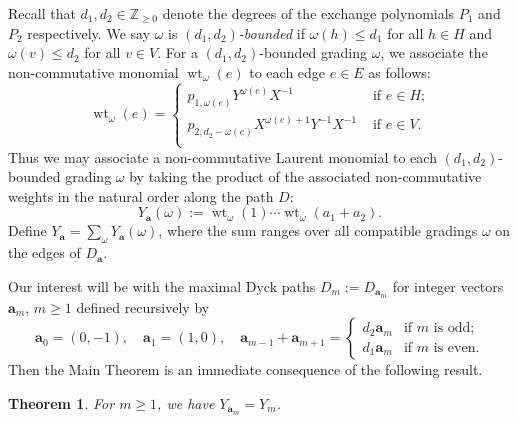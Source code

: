 \documentclass{amsart}
\newtheorem{theorem}{Theorem}[section]
\newcommand{\bfa}{\mathbf{a}}
\newcommand{\ZZ}{\mathbb{Z}}
\newcommand{\wt}{\operatorname{wt}}
\begin{document}
Recall that $d_1,d_2\in\ZZ_{\ge0}$ denote the degrees of the exchange polynomials $P_1$ and $P_2$ respectively.  We say $\omega$ is \emph{$(d_1,d_2)$-bounded} if $\omega(h)\le d_1$ for all $h\in H$ and $\omega(v)\le d_2$ for all $v\in V$.  
For a $(d_1,d_2)$-bounded grading $\omega$, we associate the non-commutative monomial $\wt_\omega(e)$ to each edge $e\in E$ as follows:
\begin{equation}\label{eq:edge weights}
  \wt_\omega(e)=\begin{cases}
                    p_{1,\omega(e)}Y^{\omega(e)}X^{-1} & \text{ if $e\in H$;}\\
                    p_{2,d_2-\omega(e)}X^{\omega(e)+1}Y^{-1}X^{-1} & \text{ if $e\in V$.}\\
                \end{cases}
\end{equation}
Thus we may associate a non-commutative Laurent monomial to each $(d_1,d_2)$-bounded grading $\omega$ by taking the product of the associated non-commutative weights in the natural order along the path $D$:
\[Y_\bfa(\omega):=\wt_\omega(1)\cdots\wt_\omega(a_1+a_2).\]
Define $Y_\bfa=\sum\limits_\omega Y_\bfa(\omega)$, where the sum ranges over all compatible gradings $\omega$ on the edges of $D_\bfa$.

Our interest will be with the maximal Dyck paths $D_m:=D_{\bfa_m}$ for integer vectors $\bfa_m$, $m\ge1$ defined recursively by
\begin{equation}\label{eq:roots recursive}
  \bfa_0=(0,-1),\quad
  \bfa_1=(1,0),\quad
  \bfa_{m-1}+\bfa_{m+1}=\begin{cases}d_2\bfa_m & \text{if $m$ is odd;}\\ d_1\bfa_m & \text{if $m$ is even.}\end{cases}
\end{equation}
Then the Main Theorem is an immediate consequence of the following result.
\begin{theorem}\label{th:combinatorial construction}
 For $m\ge1$, we have $Y_{\bfa_m}=Y_m$.
\end{theorem}

\end{document}
